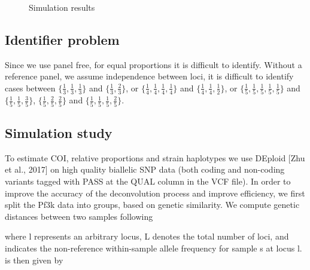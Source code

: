 \documentclass{article}
\begin{document}
\begin{figure}
  \ContinuedFloat
  \centering
  \caption{Simulation results}
\end{figure}


\subsection{Identifier problem}
Since we use panel free, for equal proportions it is difficult to identify.
Without a reference panel, we assume independence between loci, it is difficult to identify cases between $\{\frac{1}{3},\frac{1}{3},\frac{1}{3}\}$ and $\{\frac{1}{3},\frac{2}{3}\}$, or
$\{\frac{1}{4},\frac{1}{4}, \frac{1}{4}, \frac{1}{4}\}$ and $\{\frac{1}{4},\frac{1}{4}, \frac{1}{2}\}$, or $\{\frac{1}{5},\frac{1}{5}, \frac{1}{5}, \frac{1}{5}, \frac{1}{5}\}$ and $\{\frac{1}{5},\frac{1}{5}, \frac{3}{5}\}$, $\{\frac{1}{5},\frac{2}{5}, \frac{2}{5}\}$ and
$\{\frac{1}{5},\frac{1}{5}, \frac{1}{5}, \frac{2}{5}\}$.
\subsection{Simulation study}


To estimate COI, relative proportions and strain haplotypes we use DEploid [Zhu et al., 2017] on high quality biallelic SNP data (both coding and non-coding variants tagged with PASS at the QUAL column in the VCF file). In order to improve the accuracy of the deconvolution process and improve efficiency, we first split the Pf3k data into groups, based on genetic similarity. We compute genetic distances between two samples following

where l represents an arbitrary locus, L denotes the total number of loci, and  indicates the non-reference within-sample allele frequency for sample s at locus l.  is then given by
\end{document}

